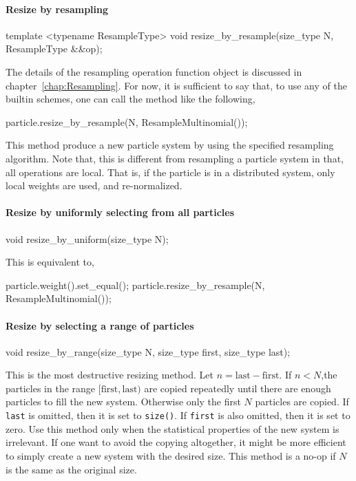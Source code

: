 \paragraph{Resize by resampling}

\begin{cppcode}
  template <typename ResampleType>
  void resize_by_resample(size_type N, ResampleType &&op);
\end{cppcode}
The details of the resampling operation function object is discussed in
chapter~\ref{chap:Resampling}. For now, it is sufficient to say that, to use
any of the builtin schemes, one can call the method like the following,
\begin{cppcode}
  particle.resize_by_resample(N, ResampleMultinomial());
\end{cppcode}
This method produce a new particle system by using the specified resampling
algorithm. Note that, this is different from resampling a particle system in
that, all operations are local. That is, if the particle is in a distributed
system, only local weights are used, and re-normalized.

\paragraph{Resize by uniformly selecting from all particles}

\begin{cppcode}
  void resize_by_uniform(size_type N);
\end{cppcode}
This is equivalent to,
\begin{cppcode}
  particle.weight().set_equal();
  particle.resize_by_resample(N, ResampleMultinomial());
\end{cppcode}

\paragraph{Resize by selecting a range of particles}

\begin{cppcode}
  void resize_by_range(size_type N, size_type first, size_type last);
\end{cppcode}
This is the most destructive resizing method. Let $n = \text{last} -
\text{first}$. If $n < N$,the particles in the range $[\text{first},
\text{last})$ are copied repeatedly until there are enough particles to fill
the new system. Otherwise only the first $N$ particles are copied. If
\verb|last| is omitted, then it is set to \verb|size()|. If \verb|first| is
also omitted, then it is set to zero. Use this method only when the statistical
properties of the new system is irrelevant. If one want to avoid the copying
altogether, it might be more efficient to simply create a new system with
the desired size. This method is a no-op if $N$ is the same as the original
size.

